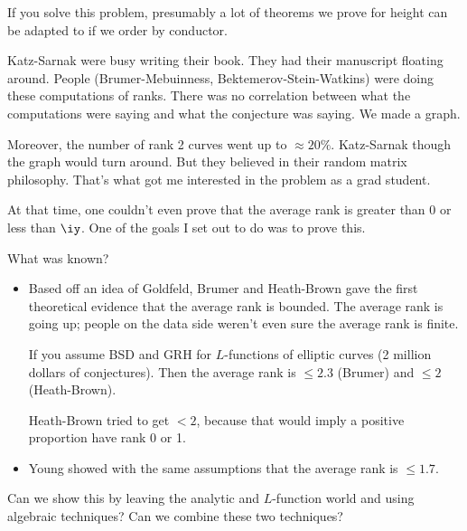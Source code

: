 If you solve this problem, presumably a lot of theorems we prove for height can be adapted to if we order by conductor.

Katz-Sarnak were busy writing their book. They had their manuscript floating around. People (Brumer-Mebuinness, Bektemerov-Stein-Watkins) were doing these computations of ranks. There was no correlation between what the computations were saying and what the conjecture was saying. We made a graph.



Moreover, the number of rank 2 curves went up to $\approx 20\%$. 
Katz-Sarnak though the graph would turn around. But they believed in their random matrix philosophy. That's what got me interested in the problem as a grad student.

At that time, one couldn't even prove that the average rank is greater than 0 or less than $\iy$.  
One of the goals I set out to do was to prove this.

What was known?
\begin{itemize}
\item
Based off an idea of Goldfeld, Brumer  and Heath-Brown gave
the first theoretical evidence that the average rank is bounded.
The average rank is going up; people on the data side weren't even sure the average rank is finite.

If you assume BSD and GRH for $L$-functions of elliptic curves (2 million dollars of conjectures). Then the average rank is $\le 2.3$ (Brumer) and $\le 2$ (Heath-Brown).

Heath-Brown tried to get $<2$, because that would imply a positive proportion have rank 0 or 1.
\item 
Young showed with the same assumptions that the average rank is $\le 1.7$.


\end{itemize}
Can we show this by leaving the analytic and $L$-function world and using algebraic techniques? Can we combine these two techniques?

